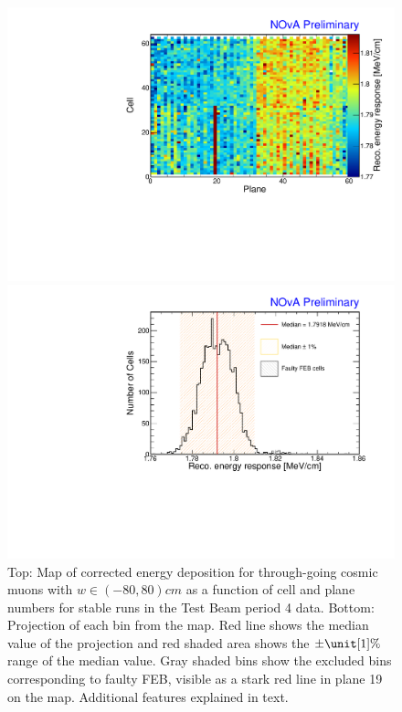 \begin{figure}[!ht]
  \centering
  \includegraphics[width=0.7\linewidth]{Plots/PCListAna/TBDataP4_recomevcm_ts_zoomed.pdf}
  
  \includegraphics[width=0.7\linewidth]{Plots/PCListAna/Variation_recomevcm_TBDataP4_StableRuns_LimW.pdf}
  \caption[Map of corrected energy deposition for through-going cosmic in data]{Top: Map of corrected energy deposition for through-going cosmic muons with $w\in\left(-80,80\right)\unit{cm}$ as a function of cell and plane numbers for stable runs in the Test Beam period 4 data. Bottom: Projection of each bin from the map. Red line shows the median value of the projection and red shaded area shows the $\pm\unit[1]{\%}$ range of the median value. Gray shaded bins show the excluded bins corresponding to faulty \acrshort{FEB}, visible as a stark red line in plane 19 on the map. Additional features explained in text.}
  \label{fig:ValidPCListAnaMapData}
\end{figure}

